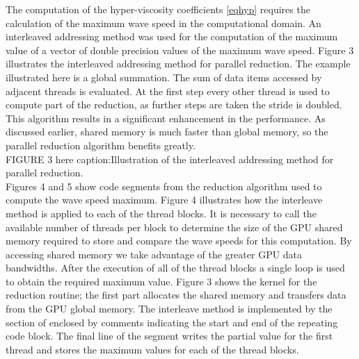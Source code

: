 \documentclass[final,1p]{elsarticle}
\begin{document}
The computation of the hyper-viscosity coefficients \eqref{eqhyp} requires the calculation of the maximum wave speed in the computational domain. An interleaved addressing method was used for the computation of the maximum value of a vector of double precision values of the maximum wave speed. Figure 3 illustrates the interleaved addressing method for parallel reduction. The example illustrated here is a global summation. The sum of data items accessed by adjacent threads is evaluated. At the first step every other thread is used to compute part of the reduction, as further steps are taken the stride is doubled. This algorithm results in a significant enhancement in the performance.  As discussed earlier, shared memory is much faster than global memory, so the parallel reduction algorithm benefits greatly.\\


FIGURE 3 here caption:Illustration of the interleaved addressing method for parallel reduction.\\




 Figures 4  and 5 show code segments from the reduction algorithm used to compute the wave speed maximum. Figure 4 illustrates how the interleave method is applied to each of the thread blocks. It is necessary to call the available number of threads per block to determine the size of the GPU shared memory required to store and compare the wave speeds for this computation. By accessing shared memory we take advantage of the greater GPU data bandwidths. After the execution of all of the thread blocks a single loop is used to obtain the required maximum value. Figure 3 shows the kernel  for the reduction  routine; the first part allocates the shared memory and transfers data from the GPU global memory. The interleave
method is implemented by the section of enclosed by comments indicating the start and end of the repeating code block. The final line of the segment writes the partial value for the first thread and stores the maximum values for each of the thread blocks.\\ 
\end{document}
